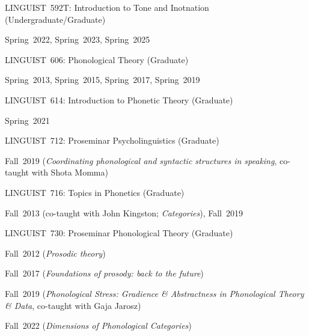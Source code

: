 \documentclass[10pt]{article}
\newcommand{\halfblankline}{\quad\vspace{-0.5\baselineskip}\pagebreak[3]}
\begin{document}
\begin{outerlist}
\begin{innerlist}
        \halfblankline
        \item LINGUIST~592T:
          Introduction to Tone and Inotnation (Undergraduate/Graduate)
        \begin{innerlist}[\enskip$\circ$,leftmargin=*]
            \item Spring~2022, Spring~2023, Spring~2025
        \end{innerlist}

        \halfblankline
        \item LINGUIST~606:
          Phonological Theory (Graduate)
        \begin{innerlist}[\enskip$\circ$,leftmargin=*]
            \item Spring~2013, Spring~2015, Spring~2017, Spring~2019
        \end{innerlist}
        \halfblankline

        \halfblankline
        \item LINGUIST~614:
          Introduction to Phonetic Theory (Graduate)
        \begin{innerlist}[\enskip$\circ$,leftmargin=*]
            \item Spring~2021
        \end{innerlist}
        \halfblankline

        \item LINGUIST~712:
          Proseminar Psycholinguistics  (Graduate)
        \begin{innerlist}[\enskip$\circ$,leftmargin=*]
            \item Fall~2019 (\emph{Coordinating phonological and syntactic structures in speaking}, co-taught with Shota Momma)
        \end{innerlist}

        \halfblankline
        \item LINGUIST~716:
          Topics in Phonetics (Graduate)
        \begin{innerlist}[\enskip$\circ$,leftmargin=*]
            \item Fall~2013 (co-taught with John Kingston; \emph{Categories}), Fall~2019
        \end{innerlist}

        \halfblankline

        \item LINGUIST~730:
          Proseminar Phonological Theory (Graduate)
        \begin{innerlist}[\enskip$\circ$,leftmargin=*]
            \item Fall~2012 (\emph{Prosodic theory})
            \item Fall~2017 (\emph{Foundations of prosody: back to the future})
            \item Fall~2019 (\emph{Phonological Stress: Gradience \& Abstractness in Phonological Theory \& Data}, co-taught with Gaja Jarosz)
            \item Fall~2022 (\emph{Dimensions of Phonological Categories})
        \end{innerlist}
        \halfblankline


\end{innerlist}
\end{outerlist}
\end{document}
